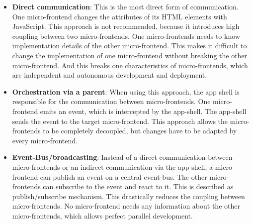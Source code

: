 \begin{itemize}
  \item \textbf{Direct communication}: This is the most direct form of communication. One micro-frontend changes the attributes of its HTML elements with JavaScript. This approach is not recommended, because it introduces high coupling between two micro-frontends. One micro-frontends needs to know implementation details of the other micro-frontend. This makes it difficult to change the implementation of one micro-frontend without breaking the other micro-frontend. And this breaks one characteristics of micro-frontends, which are independent and autonomous development and deployment.
  \item \textbf{Orchestration via a parent}: When using this approach, the app shell is responsible for the communication between micro-frontends. One micro-frontend emits an event, which is intercepted by the app-shell. The app-shell sends the event to the target micro-frontend. This approach allows the micro-frontends to be completely decoupled, but changes have to be adapted by every micro-frontend.
  \item \textbf{Event-Bus/broadcasting}: Instead of a direct communication between micro-frontends or an indirect communication via the app-shell, a micro-frontend can publish an event on a central event-bus. The other micro-frontends can subscribe to the event and react to it. This is described as publish/subscribe mechanism. This drastically reduces the coupling between micro-frontends. No micro-frontend needs any information about the other micro-frontends, which allows perfect parallel development.
\end{itemize}